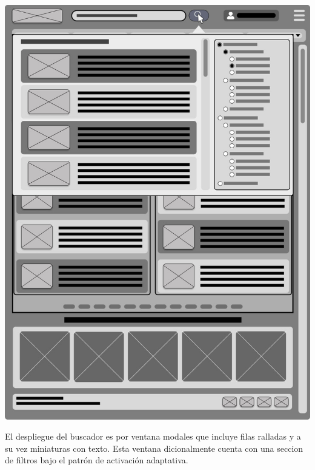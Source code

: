\documentclass[a4paper,12pt]{article}
\begin{document}
\begin{itemize}
\par \includegraphics[scale=0.85]{m5} \par

El despliegue del buscador es por ventana modales que incluye filas ralladas y a su vez miniaturas con texto. Esta ventana dicionalmente cuenta con una seccion de filtros bajo el patrón de activación adaptativa. 


\end{itemize}
\end{document}
